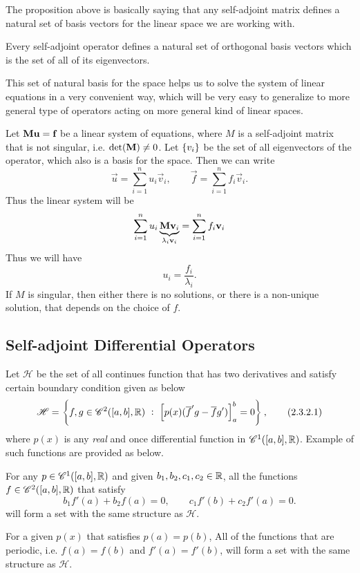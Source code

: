 The proposition above is basically saying that any self-adjoint matrix defines a natural set of basis vectors for the linear space we are working with.
\begin{observation}
	Every self-adjoint operator defines a natural set of orthogonal basis vectors which is the set of all of its eigenvectors.
\end{observation}
This set of natural basis for the space helps us to solve the system of linear equations in a very convenient way, which will be very easy to generalize to more general type of operators acting on more general kind of linear spaces. 
\begin{observation}
	Let $\textbf{M}\textbf{u} = \textbf{f}$ be a linear system of equations, where $M$ is a self-adjoint matrix that is not singular, i.e. $\det(\textbf{M}) \neq 0$. Let $\{v_i\}$ be the set of all eigenvectors of the operator, which also is a basis for the space. Then we can write
	\[ \vec{u} = \sum_{i=1}^{n} u_i \vec{v}_i, \qquad \vec{f} =\sum_{i=1}^{n} f_i \vec{v}_i. \]
	Thus the linear system will be
	\[ \sum_{i=1}^{n}u_i \underbrace{\textbf{M}\textbf{v}_i}_{\lambda_i\textbf{v}_i} =\sum_{i=1}^{n} f_i \textbf{v}_i  \]
	Thus we will have
	\[ u_i = \frac{f_i}{\lambda_i}. \]
	If $M$ is singular, then either there is no solutions, or there is a non-unique solution, that depends on the choice of $f$.
\end{observation}

\subsection{Self-adjoint Differential Operators}
Let $\mathscr{H}$ be the set of all continues function that has two derivatives and satisfy certain boundary condition given as below
\[ \mathscr{H} = \left\{ f,g \in \mathscr{C}^2([a,b],\mathbb{R})\ :\ \left[ p(x)(\overline{f}'g - \overline{f}g') \right]_a^b = 0 \right\}, \tag{2.3.2.1} \]
where $p(x)$ is any \emph{real} and once differential function in $\mathscr{C}^1([a,b],\mathbb{R})$. Example of such functions are provided as below.
\begin{example}
	For any $p \in \mathscr{C}^1([a,b],\mathbb{R})$ and given $b_1, b_2, c_1, c_2 \in \mathbb{R}$, all the functions $f\in \mathscr{C}^2([a,b],\mathbb{R})$ that satisfy
	\[ b_1f'(a) + b_2f(a)=0,\qquad c_1f'(b) + c_2f'(a) =0. \]
	will form a set with the same structure as $\mathscr{H}$.
\end{example}
 
 \begin{example}
 	For a given $p(x)$ that satisfies $p(a) = p(b)$, All of the functions that are periodic, i.e. $f(a)=f(b)$ and $f'(a) = f'(b)$, will form a set with the same structure as $\mathscr{H}$.
 \end{example}
 
